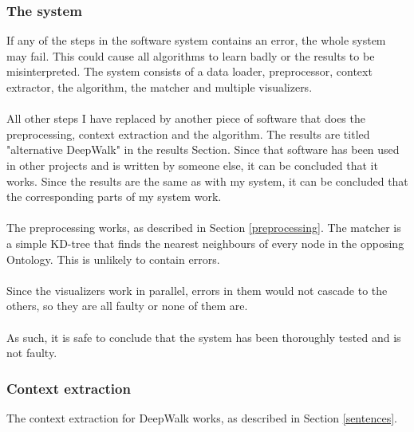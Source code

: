 \documentclass{article}
\begin{document}
  \subsubsection{The system}
  If any of the steps in the software system contains an error, the whole system may fail. This could cause all algorithms to learn badly or the results to be misinterpreted. The system consists of a data loader, preprocessor, context extractor, the algorithm, the matcher and multiple visualizers. 
  \paragraph{}
  All other steps I have replaced by another piece of software that does the preprocessing, context extraction and the algorithm. The results are titled "alternative DeepWalk" in the results Section. Since that software has been used in other projects and is written by someone else, it can be concluded that it works. Since the results are the same as with my system, it can be concluded that the corresponding parts of my system work.
  \paragraph{}
  The preprocessing works, as described in Section \ref{preprocessing}.  The matcher is a simple KD-tree that finds the nearest neighbours of every node in the opposing Ontology. This is unlikely to contain errors.
  \paragraph{}
  Since the visualizers work in parallel, errors in them would not cascade to the others, so they are all faulty or none of them are.
  \paragraph{}
  As such, it is safe to conclude that the system has been thoroughly tested and is not faulty.
  \subsubsection{Context extraction}
  The context extraction for DeepWalk works, as described in Section \ref{sentences}.
\end{document}
